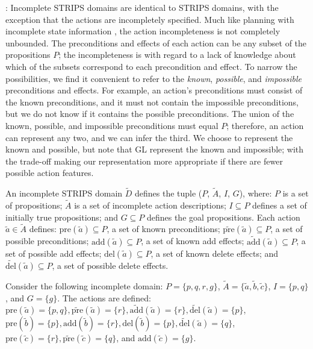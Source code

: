 \documentclass[letterpaper]{article}
\def\und#1{\noindent{\bf #1}:}
\def\citep#1{\cite{#1}}
\begin{document}
\und{Incomplete STRIPS Domains}
Incomplete STRIPS domains are identical to STRIPS domains, with the exception
that the actions are incompletely specified.  Much like planning with incomplete
state information \citep{pff,aij-mclug}, the action incompleteness is not
completely unbounded.  The preconditions and effects of each action can be any
subset of the propositions $P$; the incompleteness is with regard to a lack of
knowledge about which of the subsets correspond to each precondition and effect.
 To narrow the possibilities, we find it convenient to refer to the {\em known},
{\em possible}, and {\em impossible} preconditions and effects.  For example, an
action's preconditions must consist of the known preconditions, and it must not
contain the impossible preconditions, but we do not know if it contains the
possible preconditions.  The union of the known, possible, and impossible
preconditions must equal $P$; therefore, an action can represent any two, and we
can infer the third.  We choose to represent the known and possible, but note
that GL represent the known and impossible; with the trade-off making our
representation more appropriate if there are fewer possible action features.

An incomplete STRIPS domain $\tilde{D}$  defines the tuple ($P$, $\tilde{A}$,
$I$, $G$), where: $P$ is a  set of propositions; $\tilde{A}$ is a set of
incomplete action descriptions; $I \subseteq P$ defines a set of initially true
propositions; and $G \subseteq P$ defines the goal propositions. Each action
$\tilde{a} \in \tilde{A}$ defines: $\text{pre}(\tilde{a}) \subseteq P$, a set of
known preconditions; $\widetilde{\text{pre}}(\tilde{a}) \subseteq P$, a set of
possible preconditions; $\text{add}(\tilde{a}) \subseteq P$, a set of known add
effects;  $\widetilde{\text{add}}(\tilde{a}) \subseteq P$, a set of possible add
effects; $\text{del}(\tilde{a}) \subseteq P$, a set of known delete effects; and
$\widetilde{\text{del}}(\tilde{a}) \subseteq P$, a set of possible delete
effects.

Consider the following incomplete domain: $P = \{p, q, r, g\}$, $\tilde{A} =
\{\tilde{a}, \tilde{b}, \tilde{c}\}$, $I = \{p, q\}$, and $G= \{g\}$.  The
actions are defined: $\text{pre}(\tilde{a}) = \{p, q\},
\widetilde{\text{pre}}(\tilde{a})  = \{r\}, \widetilde{\text{add}}(\tilde{a}) =
\{r\},  \widetilde{\text{del}}(\tilde{a}) = \{p\}$, $
  \text{pre}(\tilde{b}) = \{p\},
 \text{add}(\tilde{b}) = \{r\},
  \text{del}(\tilde{b}) = \{p\}, \widetilde{\text{del}}(\tilde{a}) = \{q\}$, 
 $ \text{pre}(\tilde{c}) = \{r\}, \widetilde{\text{pre}}(\tilde{c})  = \{q\}$,
 and  $\text{add}(\tilde{c}) = \{g\}$.
\end{document}
